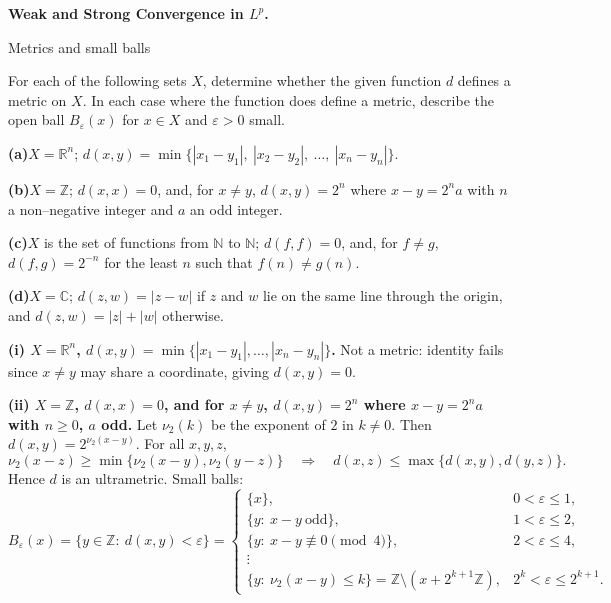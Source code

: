 \begin{problem}[CP-II-0561]
\label{prob:cp-ii-0561}
\textbf{Weak and Strong Convergence in \(L^p\).}

\hspace*{1.5em}Metrics and small balls

For each of the following sets $X$, determine whether the given function $d$ defines a metric on $X$.
In each case where the function does define a metric, describe the open ball $B_\varepsilon(x)$
for $x\in X$ and $\varepsilon>0$ small.

	\par\smallskip\noindent\textbf{(a)}\quad $X=\mathbb{R}^n$; \quad $d(x,y)=\min\{|x_1-y_1|,\ |x_2-y_2|,\ \ldots,\ |x_n-y_n|\}$.
	\par\smallskip\noindent\textbf{(b)}\quad $X=\mathbb{Z}$; \quad $d(x,x)=0$, and, for $x\neq y$, $d(x,y)=2^{n}$ where $x-y=2^{n}a$ with
	$n$ a non--negative integer and $a$ an odd integer.
	\par\smallskip\noindent\textbf{(c)}\quad $X$ is the set of functions from $\mathbb{N}$ to $\mathbb{N}$; \quad $d(f,f)=0$, and, for $f\neq g$,
	$d(f,g)=2^{-n}$ for the least $n$ such that $f(n)\neq g(n)$.
	\par\smallskip\noindent\textbf{(d)}\quad $X=\mathbb{C}$; \quad $d(z,w)=|z-w|$ if $z$ and $w$ lie on the same line through the origin,
	and $d(z,w)=|z|+|w|$ otherwise.

\par\medskip\noindent\textbf{(i) $X=\mathbb{R}^n$, $d(x,y)=\min\{|x_1-y_1|,\dots,|x_n-y_n|\}$.}\quad
Not a metric: identity fails since $x\neq y$ may share a coordinate, giving $d(x,y)=0$.

\par\medskip\noindent\textbf{(ii) $X=\mathbb{Z}$, $d(x,x)=0$, and for $x\neq y$, $d(x,y)=2^{n}$ where $x-y=2^{n}a$ with $n\ge0$, $a$ odd.}\quad
Let $\nu_2(k)$ be the exponent of $2$ in $k\neq0$. Then $d(x,y)=2^{\nu_2(x-y)}$.
For all $x,y,z$,
\[
\nu_2(x-z)\ge \min\{\nu_2(x-y),\nu_2(y-z)\}\quad\Rightarrow\quad
d(x,z)\le \max\{d(x,y),d(y,z)\}.
\]
Hence $d$ is an ultrametric. Small balls:
\[
B_\varepsilon(x)=\{y\in\mathbb Z:\ d(x,y)<\varepsilon\}=
\begin{cases}
	\{x\}, & 0<\varepsilon\le 1,\\[2mm]
	\{y:\ x-y\ \text{odd}\}, & 1<\varepsilon\le 2,\\[1mm]
	\{y:\ x-y\not\equiv 0\pmod{4}\}, & 2<\varepsilon\le 4,\\[1mm]
	\vdots\\
	\{y:\ \nu_2(x-y)\le k\}=\mathbb Z\setminus (x+2^{k+1}\mathbb Z), & 2^{k}<\varepsilon\le 2^{k+1}.
\end{cases}
\]


\end{problem}
